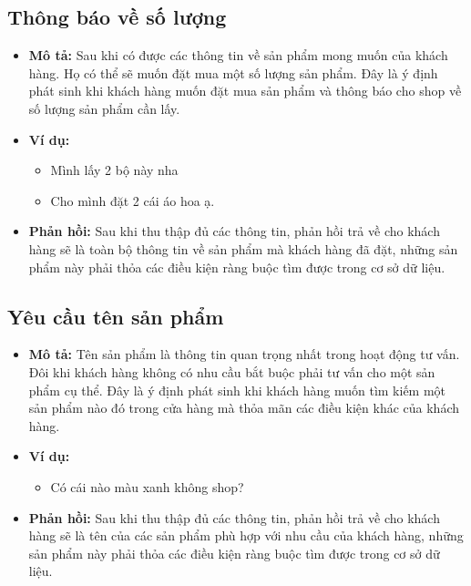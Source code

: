 \subsection{Thông báo về số lượng}
\begin{itemize}
    \item \textbf{Mô tả:} Sau khi có được các thông tin về sản phẩm mong muốn của khách hàng. Họ có thể sẽ muốn đặt mua một số lượng sản phẩm. Đây là ý định phát sinh khi khách hàng muốn đặt mua sản phẩm và thông báo cho shop về số lượng sản phẩm cần lấy.
    \item \textbf{Ví dụ:}
    \begin{itemize}
        \item Mình lấy 2 bộ này nha
        \item Cho mình đặt 2 cái áo hoa ạ.
    \end{itemize}
    \item \textbf{Phản hồi:} Sau khi thu thập đủ các thông tin, phản hồi trả về cho khách hàng sẽ là toàn bộ thông tin về sản phẩm mà khách hàng đã đặt, những sản phẩm này phải thỏa các điều kiện ràng buộc tìm được trong cơ sở dữ liệu.
\end{itemize}

\subsection{Yêu cầu tên sản phẩm}
\begin{itemize}
    \item \textbf{Mô tả:} Tên sản phẩm là thông tin quan trọng nhất trong hoạt động tư vấn. Đôi khi khách hàng không có nhu cầu bắt buộc phải tư vấn cho một sản phẩm cụ thể. Đây là ý định phát sinh khi khách hàng muốn tìm kiếm một sản phẩm nào đó trong cửa hàng mà thỏa mãn các điều kiện khác của khách hàng.
    \item \textbf{Ví dụ:}
    \begin{itemize}
        \item Có cái nào màu xanh không shop?
    \end{itemize}
    \item \textbf{Phản hồi:} Sau khi thu thập đủ các thông tin, phản hồi trả về cho khách hàng sẽ là tên của các sản phẩm phù hợp với nhu cầu của khách hàng, những sản phẩm này phải thỏa các điều kiện ràng buộc tìm được trong cơ sở dữ liệu.
\end{itemize}

